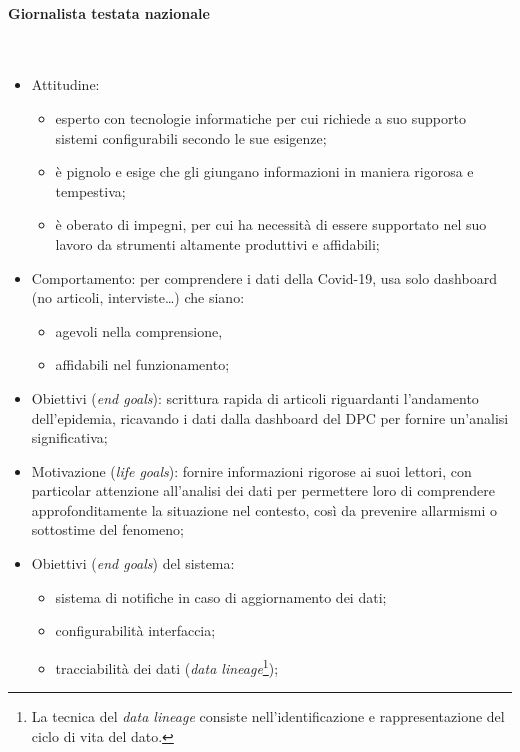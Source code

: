 \paragraph{Giornalista testata nazionale}\mbox{}\\
\begin{itemize}
	\item Attitudine:
	\begin{itemize}
        \item esperto con tecnologie informatiche per cui richiede a suo supporto sistemi configurabili secondo le sue esigenze;
        \item è pignolo e esige che gli giungano informazioni in maniera rigorosa e tempestiva;
        \item è oberato di impegni, per cui ha necessità di essere supportato nel suo lavoro da strumenti altamente produttivi e affidabili;
    \end{itemize}
    \item Comportamento: per comprendere i dati della Covid-19, usa solo dashboard (no articoli, interviste…) che siano:
	\begin{itemize}
	    \item agevoli nella comprensione,
	    \item affidabili nel funzionamento;
    \end{itemize}
	\item Obiettivi (\textit{end goals}): scrittura rapida di articoli riguardanti l'andamento dell'epidemia, ricavando i dati dalla dashboard del DPC per fornire un'analisi significativa;
	\item Motivazione (\textit{life goals}): fornire informazioni rigorose ai suoi lettori, con particolar attenzione all'analisi dei dati per permettere loro di comprendere approfonditamente la situazione nel contesto, così da prevenire allarmismi o sottostime del fenomeno;
	\item Obiettivi (\textit{end goals}) del sistema:
	\begin{itemize}
	    \item sistema di notifiche in caso di aggiornamento dei dati;
	    \item configurabilità interfaccia;
	    \item tracciabilità dei dati (\textit{data lineage}\footnote{La tecnica del \textit{data lineage} consiste nell’identificazione e rappresentazione del ciclo di vita del dato.});
    \end{itemize}
\end{itemize}

